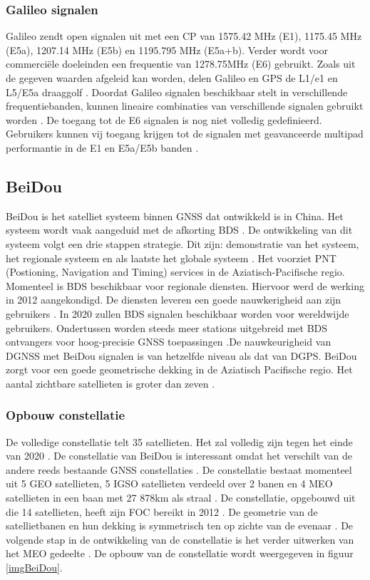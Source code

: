 \subsubsection{Galileo signalen}
Galileo zendt open signalen uit met een CP van 1575.42 MHz (E1), 1175.45 MHz (E5a), 1207.14 MHz (E5b) en 1195.795 MHz (E5a+b). Verder wordt voor commerci\"ele doeleinden een frequentie van 1278.75MHz (E6) gebruikt. Zoals uit de gegeven waarden afgeleid kan worden, delen Galileo en GPS de  L1/e1 en L5/E5a draaggolf \cite{LBibPPP2}. Doordat Galileo signalen beschikbaar stelt in verschillende frequentiebanden, kunnen lineaire combinaties van verschillende signalen gebruikt worden \cite{LBibGalileo3}. De toegang tot de E6 signalen is nog niet volledig gedefinieerd. Gebruikers kunnen vij toegang krijgen tot de signalen met geavanceerde multipad performantie in de E1 en E5a/E5b banden \cite{LBibGNSS9}. 

\subsection{BeiDou}
\label{LBeD}
BeiDou is het satelliet systeem binnen GNSS dat ontwikkeld is in China. Het systeem wordt vaak  aangeduid met de afkorting BDS \cite{LBibBeiDou}. De ontwikkeling van dit systeem volgt een drie stappen strategie. Dit zijn: demonstratie van het systeem, het regionale systeem en als laatste het globale systeem \cite{LBibBeiDou4}. Het voorziet PNT (Postioning, Navigation and Timing) services in de Aziatisch-Pacifische regio. Momenteel is BDS  beschikbaar voor regionale diensten. Hiervoor werd de werking in 2012 aangekondigd. De diensten leveren een goede nauwkerigheid aan zijn gebruikers \cite{LBibBeiDou, LBibGNSS9}. In 2020 zullen BDS signalen beschikbaar worden voor wereldwijde gebruikers. Ondertussen worden steeds meer stations uitgebreid met BDS ontvangers voor hoog-precisie GNSS toepassingen \cite{LBibBeiDou}.De nauwkeurigheid van DGNSS met BeiDou signalen is van hetzelfde niveau als dat van DGPS. BeiDou zorgt voor een goede geometrische dekking in de Aziatisch Pacifische regio. Het aantal zichtbare satellieten is groter dan zeven \cite{LBibBeiDou4}. 

\subsubsection{Opbouw constellatie}
De volledige constellatie telt 35 satellieten. Het zal volledig zijn tegen het einde van 2020 \cite{LBibGNSS4}. De constellatie van BeiDou is interessant omdat het verschilt van de andere reeds bestaande GNSS constellaties \cite{LBibBeiDou3}.  De constellatie bestaat momenteel uit 5 GEO satellieten, 5 IGSO satellieten verdeeld over 2 banen en 4 MEO satellieten in een baan met 27 878km als straal \cite{LBibBeiDou2}. De constellatie, opgebouwd uit die 14 satellieten, heeft zijn FOC bereikt in 2012 \cite{LBibBeiDou4}. De geometrie van de satellietbanen en hun dekking is symmetrisch ten op zichte van de evenaar \cite{LBibBeiDou5}.  De volgende stap in de ontwikkeling van de constellatie is het verder uitwerken van het MEO gedeelte \cite{LBibPPP2}. De opbouw van de constellatie wordt weergegeven in figuur \ref{imgBeiDou}.

